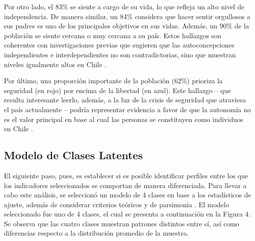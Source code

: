 \documentclass[12pt,oneside]{templates/facsothesis}
\begin{document}
Por otro lado, el 83\% se siente a cargo de su vida, lo que refleja un alto nivel de independencia. De manera similar, un 84\% considera que hacer sentir orgullosos a sus padres es uno de los principales objetivos en sus vidas. Además, un 90\% de la población se siente cercana o muy cercana a su país. Estos hallazgos son coherentes con investigaciones previas que sugieren que las autoconcepciones independientes e interdependientes no son contradictorias, sino que muestran niveles igualmente altos en Chile \citep{benavides2020, kolstad2009}.

Por último, una proporción importante de la población (62\%) prioriza la seguridad (en rojo) por encima de la libertad (en azul). Este hallazgo -- que resulta interesante leerlo, además, a la luz de la crisis de seguridad que atraviesa el país actualmente -- podría representar evidencia a favor de que la autonomía no es el valor principal en base al cual las personas se constituyen como individuos en Chile \citep{martuccelli2010}.

\hypertarget{modelo-de-clases-latentes}{%
\subsection*{Modelo de Clases Latentes}\label{modelo-de-clases-latentes}}

El siguiente paso, pues, es establecer si es posible identificar perfiles entre los que los indicadores seleccionados se comportan de manera diferenciada. Para llevar a cabo este análisis, se seleccionó un modelo de 4 clases en base a los estadísticos de ajuste, además de considerar criterios teóricos y de parsimonia \citep{collins2010}. El modelo seleccionado fue uno de 4 clases, el cual se presenta a continuación en la Figura 4. Se observa que las cuatro clases muestran patrones distintos entre sí, así como diferencias respecto a la distribución promedio de la muestra.
\end{document}

